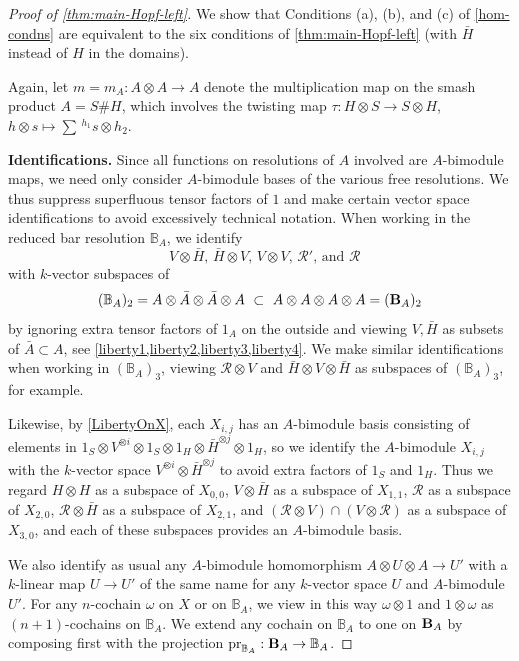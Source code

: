 \documentclass[11pt]{amsart}
\numberwithin{equation}{section}
\newcommand{\pr}{ {\rm{pr}} }%
\newcommand{\R}{\mathcal{R}}
\newcommand{\B}{{\bf B}} %
\newcommand{\BB}{\mathbb{B}} %
\newcommand{\itau}{{\tau^{-1}}}%
\renewcommand{\_}[1]{\mbox{$_{\left( #1 \right)}$}}
\newcommand{\ot}{\otimes}
\newcommand{\Ho}{H}%
\begin{document}
{\begin{proof}[Proof of \cref{thm:main-Hopf-left}]
  We show that  Conditions (a), (b), and (c) of \cref{hom-condns}
    are equivalent
    to the six conditions of \cref{thm:main-Hopf-left}
    (with $\bar H$ instead of $H$ in the domains).
 
Again, let $m=m_{A}:A\ot A\rightarrow A$ denote the multiplication map on
  the smash product $A=S\# \Ho$, which involves the twisting map
  $\tau: \Ho\ot S \rightarrow S\ot \Ho$,
  $h\ot  s \mapsto \sum \, ^{h_1}s \ot h_2$.

 {\bf Identifications.}
 Since all functions on resolutions of $A$
  involved 
  are $A$-bimodule 
  maps, we need only consider $A$-bimodule bases of the various free resolutions.
We thus suppress superfluous tensor factors of $1$
and make certain vector space identifications to avoid excessively
technical notation.
When working in the reduced
bar resolution $\BB_A$, we identify 
\begin{equation*} 
  \text{ 
    $V\ot \bar H$, \ $\bar H \ot V$, \ $V\ot V$, \ $\R'$, and $\R$}
\end{equation*}
    with 
    $k$-vector subspaces of
    $$
    (\BB_A)_2 = A\ot \bar A \ot \bar A \ot A
    \ \subset\  A\ot A \ot A \ot A = (\B_A)_2
    $$
    by ignoring extra tensor factors of $1_A$ on the outside
    and viewing $V,\bar H$ as subsets of $\bar A\subset A$,
    see \cref{liberty1,liberty2,liberty3,liberty4}.
    We make similar identifications when working in $(\BB_A)_3$,
    viewing $\R\ot V$ and $\bar H\ot V \ot \bar H$ as subspaces of
    $(\BB_A)_3$,
    for example. 

  Likewise,  by \cref{LibertyOnX},
  each $X_{i,j}$ has an $A$-bimodule basis consisting of
  elements in $1_S\ot V^{\ot i}\ot 1_S\ot 1_H\ot \bar H^{\ot j}\ot 1_H$,
  so we identify the $A$-bimodule $X_{i,j}$
  with the $k$-vector space $V^{\ot i}\ot \bar H^{\ot j}$
    to avoid extra factors of $1_S$ and $1_H$.
  Thus we regard
  $H\ot H$ as a subspace of $X_{0,0}$,
  $V\ot \bar H$ as a subspace of $X_{1,1}$,
  $\R$ as a subspace of $X_{2,0}$,
$\R\ot \bar H$ as a subspace of $X_{2,1}$, and 
$ (\R\ot V)\cap(V\ot \R)$ as a subspace of $X_{3,0}$,
and each of these subspaces provides an $A$-bimodule basis.

% 

We also identify as usual
any $A$-bimodule homomorphism 
$A\ot U\ot A\rightarrow U'$
with a $k$-linear map
$U\rightarrow U'$ of the same name
for any $k$-vector space $U$ and $A$-bimodule $U'$.
For any $n$-cochain $\omega$ on $X$ or on $\BB_A$,
we view in this way 
$\omega\ot 1$ and $1\ot \omega$ as $(n+1)$-cochains
on $\BB_A$.
We extend any cochain on $\BB_A$ to one on $\B_A$
by composing first with the projection $\pr_{\BB_A}:\B_A\rightarrow \BB_A$.


\end{proof}}
\end{document}
